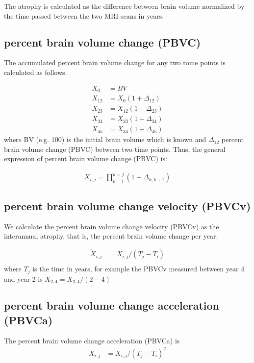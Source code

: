 \documentclass[twoside,onecolumn]{article}
\begin{document}

The atrophy is calculated as the difference between brain volume normalized by the time passed between the two MRI scans in years. 


\subsection{percent brain volume change (PBVC)}
The accumulated percent brain volume change for any two tome points is calculated as follows.

\begin{equation} \label{eq:xij}
\begin{split}
X_{0} & = BV \\ 
X_{12} & = X_{0}(1 + \Delta_{12}) \\ 
X_{23} & = X_{12}(1 + \Delta_{23}) \\ 
X_{34} & = X_{23}(1 + \Delta_{34}) \\
X_{45} & = X_{34}(1 + \Delta_{45})
\end{split}
\end{equation}
where BV (e.g. 100) is the initial brain volume which is known and $\Delta_{12}$ percent brain volume change (PBVC) between two time points. Thus, the general expression of percent brain volume change (PBVC) is: 

\begin{align} 
X_{i,j} = \prod_{k=i}^{k=j} (1+ \Delta_{k,k+1})
\label{eq:accloss}
\end{align} 

\subsection{percent brain volume change velocity (PBVCv)}
We calculate the percent brain volume change velocity (PBVCv) as the interannual atrophy, that is, the percent brain volume change per year. 

\begin{align*} 
\dot{X}_{i,j} & = X_{i,j}/(T_j-T_i) \\ 
\end{align*} 
where $T_j$ is the time in years, for example the PBVCv measured between year 4 and year 2 is $\dot{X}_{2,4} = X_{2,4}/(2-4)$ 

\subsection{percent brain volume change acceleration (PBVCa)}
The percent brain volume change acceleration (PBVCa) is
\begin{align*} 
\dot{X}_{i,j} & = X_{i,j}/(T_j-T_i)^{2} \\ 
\end{align*} 
\end{document}
